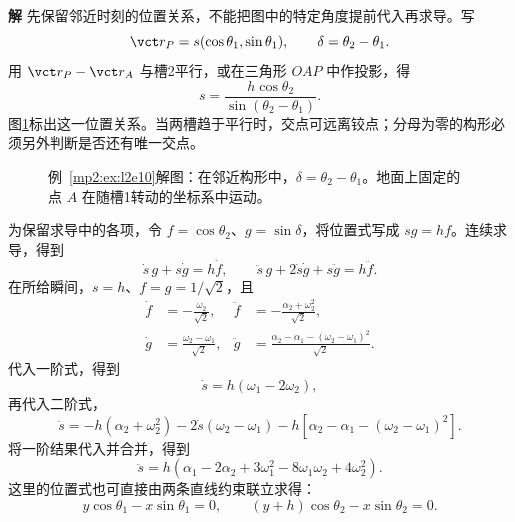 \documentclass[11pt,openany,fontset=fandol]{ctexbook}
\theoremstyle{definition}\newtheorem{example}{例}[chapter]\newtheorem{exercise}{习题}[chapter]
\newcommand{\SolutionStart}{\par\medskip\ifdim\pagetotal>0pt\ifdim\dimexpr\pagegoal-\pagetotal\relax<3\baselineskip\newpage\fi\fi\noindent\textbf{解}\quad\ignorespaces}
\newenvironment{solution}{\SolutionStart}{\par\medskip}
\begin{document}
\begin{solution}
先保留邻近时刻的位置关系，不能把图中的特定角度提前代入再求导。写
\[
\vct r_P=s(\cos\theta_1,\sin\theta_1),
\qquad \delta=\theta_2-\theta_1.
\]
用 $\vct r_P-\vct r_A$ 与槽2平行，或在三角形 $OAP$ 中作投影，得
\[
s=\frac{h\cos\theta_2}{\sin(\theta_2-\theta_1)}.
\]
图\ref{mp2:fig:l2e10-s}标出这一位置关系。当两槽趋于平行时，交点可远离铰点；分母为零的构形必须另外判断是否还有唯一交点。

\begin{figure}[H]\centering
{}
\caption{例~\ref{mp2:ex:l2e10}解图：在邻近构形中，$\delta=\theta_2-\theta_1$。地面上固定的点 $A$ 在随槽1转动的坐标系中运动。}\label{mp2:fig:l2e10-s}
\end{figure}

为保留求导中的各项，令 $f=\cos\theta_2$、$g=\sin\delta$，将位置式写成 $sg=hf$。连续求导，得到
\[
\dot s\,g+s\dot g=h\dot f,
\qquad
\ddot s\,g+2\dot s\dot g+s\ddot g=h\ddot f.
\]
在所给瞬间，$s=h$、$f=g=1/\sqrt2$，且
\[
\begin{aligned}
\dot f&=-\frac{\omega_2}{\sqrt2},&
\ddot f&=-\frac{\alpha_2+\omega_2^2}{\sqrt2},\\
\dot g&=\frac{\omega_2-\omega_1}{\sqrt2},&
\ddot g&=\frac{\alpha_2-\alpha_1-(\omega_2-\omega_1)^2}{\sqrt2}.
\end{aligned}
\]
代入一阶式，得到
\[
\dot s=h(\omega_1-2\omega_2),
\]
再代入二阶式，
\[
\ddot s=-h(\alpha_2+\omega_2^2)-2\dot s(\omega_2-\omega_1)
-h[\alpha_2-\alpha_1-(\omega_2-\omega_1)^2].
\]
将一阶结果代入并合并，得到
\[
\ddot s=h(\alpha_1-2\alpha_2+3\omega_1^2-8\omega_1\omega_2+4\omega_2^2).
\]
这里的位置式也可直接由两条直线约束联立求得：
\[
y\cos\theta_1-x\sin\theta_1=0,
\qquad (y+h)\cos\theta_2-x\sin\theta_2=0.
\]


\end{solution}
\end{document}
